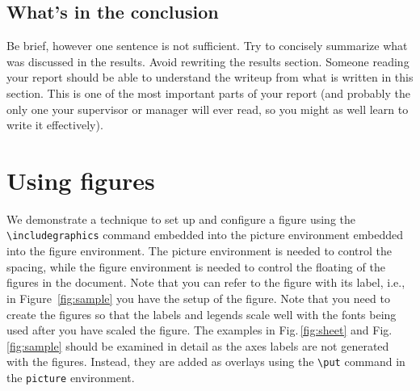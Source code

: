 \subsection{What's in the conclusion}

Be brief, however one sentence is not sufficient. Try to concisely
summarize what was discussed in the results. Avoid rewriting the
results section. Someone reading your report should be able to 
understand the writeup from what is written in this section.
This is one of the most important parts of your report (and probably
the only one your supervisor or manager will ever read, so you might
as well learn to write it effectively).






\section{Using figures}
We demonstrate a technique to set up and configure
a figure using the {\tt \verb+\includegraphics+} command embedded into
the picture environment embedded into the figure environment.
The picture environment is needed to control the spacing, while the
figure environment is needed to control the floating of the figures
in the document. Note that you can refer to the figure with its
label, i.e., in Figure~\ref{fig:sample} you have the setup of the figure.
Note that you need to create the figures so that the labels and legends
scale well with the fonts being used after you have scaled the figure.
The examples in Fig.\,\ref{fig:sheet} and Fig.\,\ref{fig:sample} should
be examined in detail as the axes labels are not generated with the
figures. Instead, they are added as overlays using the
{\tt \verb+\put+} command in the {\tt picture} environment.

